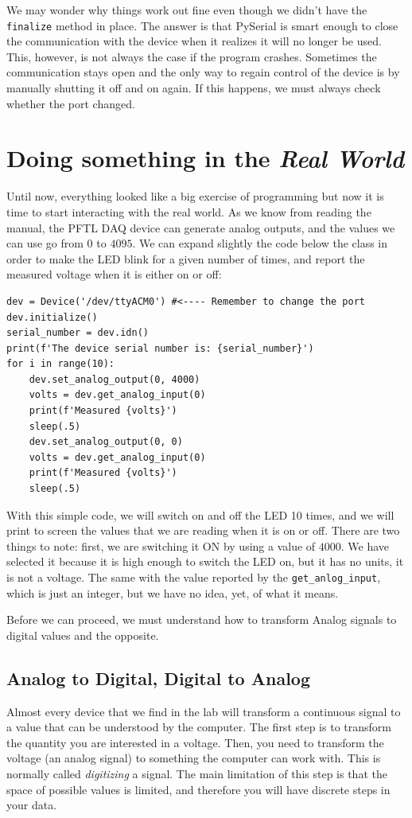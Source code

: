 We may wonder why things work out fine even though we didn't have the \texttt{finalize} method in place. The answer is that PySerial is smart enough to close the communication with the device when it realizes it will no longer be used. This, however, is not always the case if the program crashes. Sometimes the communication stays open and the only way to regain control of the device is by manually shutting it off and on again. If this happens, we must always check whether the port changed.

\section{Doing something in the \emph{Real World}}
Until now, everything looked like a big exercise of programming but now it is time to start interacting with the real world. As we know from reading the manual, the {PFTL DAQ} device can generate analog outputs, and the values we can use go from $0$ to $4095$. We can expand slightly the code below the class in order to make the LED blink for a given number of times, and report the measured voltage when it is either on or off:

\begin{verbatim}
dev = Device('/dev/ttyACM0') #<---- Remember to change the port
dev.initialize()
serial_number = dev.idn()
print(f'The device serial number is: {serial_number}')
for i in range(10):
    dev.set_analog_output(0, 4000)
    volts = dev.get_analog_input(0)
    print(f'Measured {volts}')
    sleep(.5)
    dev.set_analog_output(0, 0)
    volts = dev.get_analog_input(0)
    print(f'Measured {volts}')
    sleep(.5)
\end{verbatim}

With this simple code, we will switch on and off the LED 10 times, and we will print to screen the values that we are reading when it is on or off. There are two things to note: first, we are switching it ON by using a value of $4000$. We have selected it because it is high enough to switch the LED on, but it has no units, it is not a voltage. The same with the value reported by the \texttt{get\_anlog\_input}, which is just an integer, but we have no idea, yet, of what it means.

Before we can proceed, we must understand how to transform Analog signals to digital values and the opposite.

\subsection{Analog to Digital, Digital to Analog}\label{subsection:digitazing}
Almost every device that we find in the lab will transform a continuous signal to a value that can be understood by the computer. The first step is to transform the quantity you are interested in a voltage. Then, you need to transform the voltage (an analog signal) to something the computer can work with. This is normally called \emph{digitizing} a signal. The main limitation of this step is that the space of possible values is limited, and therefore you will have discrete steps in your data.

